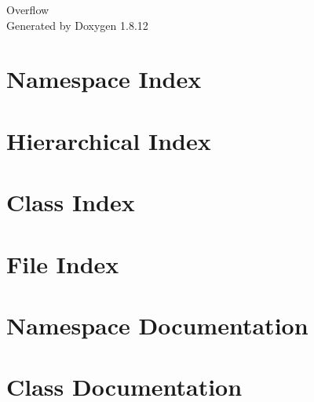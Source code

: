 \documentclass[twoside]{book}
\newcommand{\+}{\discretionary{\mbox{\scriptsize$\hookleftarrow$}}{}{}}
\newcommand{\clearemptydoublepage}{%
  \newpage{\pagestyle{empty}\cleardoublepage}%
}
\begin{document}
\hypersetup{pageanchor=false,
             bookmarksnumbered=true,
             pdfencoding=unicode
            }
\begin{titlepage}
\vspace*{7cm}
\begin{center}%
{\Large Overflow }\\
\vspace*{1cm}
{\large Generated by Doxygen 1.8.12}\\
\end{center}
\end{titlepage}
\clearemptydoublepage
{}
\tableofcontents
\clearemptydoublepage
{}
\hypersetup{pageanchor=true}

\chapter{Namespace Index}

\chapter{Hierarchical Index}

\chapter{Class Index}

\chapter{File Index}

\chapter{Namespace Documentation}







\chapter{Class Documentation}

























\end{document}
